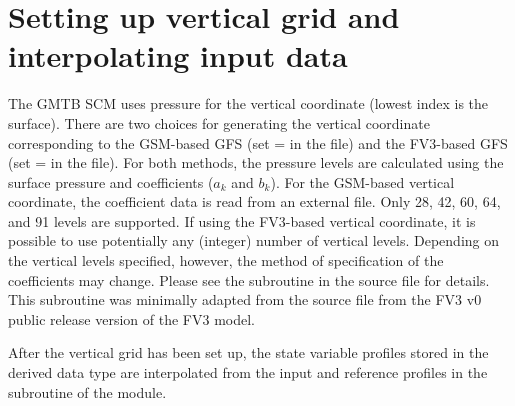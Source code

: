 \section{Setting up vertical grid and interpolating input data}
The GMTB SCM uses pressure for the vertical coordinate (lowest index is the surface). There are two choices for generating the vertical coordinate corresponding to the GSM-based GFS (set  =  in the  file) and the FV3-based GFS (set  =  in the  file). For both methods, the pressure levels are calculated using the surface pressure and coefficients ($a_k$ and $b_k$). For the GSM-based vertical coordinate, the coefficient data is read from an external file. Only 28, 42, 60, 64, and 91 levels are supported. If using the FV3-based vertical coordinate, it is possible to use potentially any (integer) number of vertical levels. Depending on the vertical levels specified, however, the method of specification of the coefficients may change. Please see the subroutine  in the source file  for details. This subroutine was minimally adapted from the source file  from the FV3 v0 public release version of the FV3 model.

After the vertical grid has been set up, the state variable profiles stored in the  derived data type are interpolated from the input and reference profiles in the  subroutine of the  module.

